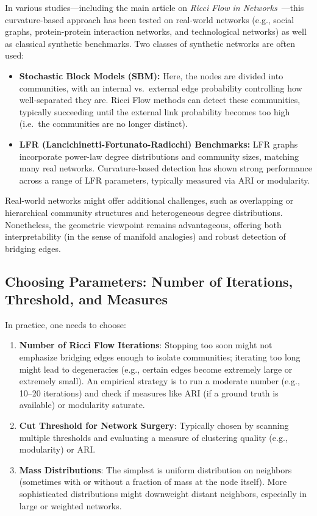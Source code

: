 In various studies---including the main article on \emph{Ricci Flow in Networks}~\cite{main-article}---this curvature-based approach has been tested on real-world networks (e.g., social graphs, protein-protein interaction networks, and technological networks) as well as classical synthetic benchmarks. Two classes of synthetic networks are often used:
\begin{itemize}
    \item \textbf{Stochastic Block Models (SBM):} Here, the nodes are divided into communities, with an internal vs.\ external edge probability controlling how well-separated they are. Ricci Flow methods can detect these communities, typically succeeding until the external link probability becomes too high (i.e.\ the communities are no longer distinct).
    \item \textbf{LFR (Lancichinetti-Fortunato-Radicchi) Benchmarks:} LFR graphs incorporate power-law degree distributions and community sizes, matching many real networks. Curvature-based detection has shown strong performance across a range of LFR parameters, typically measured via ARI or modularity.
\end{itemize}
Real-world networks might offer additional challenges, such as overlapping or hierarchical community structures and heterogeneous degree distributions. Nonetheless, the geometric viewpoint remains advantageous, offering both interpretability (in the sense of manifold analogies) and robust detection of bridging edges.

\subsection{Choosing Parameters: Number of Iterations, Threshold, and Measures}
\label{subsec:choosing_params}

In practice, one needs to choose:
\begin{enumerate}
    \item \textbf{Number of Ricci Flow Iterations}: Stopping too soon might not emphasize bridging edges enough to isolate communities; iterating too long might lead to degeneracies (e.g., certain edges become extremely large or extremely small). An empirical strategy is to run a moderate number (e.g., 10--20 iterations) and check if measures like ARI (if a ground truth is available) or modularity saturate.
    \item \textbf{Cut Threshold for Network Surgery}: Typically chosen by scanning multiple thresholds and evaluating a measure of clustering quality (e.g., modularity) or ARI. 
    \item \textbf{Mass Distributions}: The simplest is uniform distribution on neighbors (sometimes with or without a fraction of mass at the node itself). More sophisticated distributions might downweight distant neighbors, especially in large or weighted networks.
\end{enumerate}


